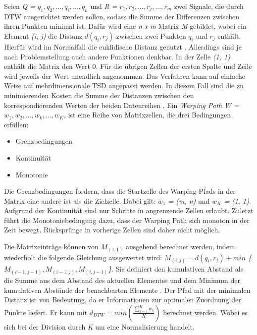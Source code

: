 Seien \emph{Q = $q_{1}, q_{2}, ... , q_{i}, ... , q_{n}$} und \emph{R = $r_{1}, r_{2}, ... , r_{j}, ... , r_{m}$}
zwei Signale, die durch \ac{DTW} ausgerichtet werden sollen, sodass die Summe der Differenzen zwischen ihren Punkten minimal ist.
Dafür wird eine \emph{n x m} Matrix \emph{M} gebildet, wobei ein Element \emph{(i, j)} die Distanz \emph{$d(q_{i}, r_{j})$}
zwischen zwei Punkten \emph{$q_{i}$} und \emph{$r_{j}$} enthält.
Hierfür wird im Normalfall die euklidische Distanz genutzt \citep{warren_liao_clustering_2005}.
Allerdings sind je nach Problemstellung auch andere Funktionen denkbar.
In der Zelle \emph{(1, 1)} enthält die Matrix den Wert 0.
Für die übrigen Zellen der ersten Spalte und Zeile wird jeweils der Wert {\glqq unendlich\grqq} angenommen.
Das Verfahren kann auf einfache Weise auf mehrdimensionale \ac{TSD} angepasst werden.
In diesem Fall sind die zu minimierenden Kosten die Summe
der Distanzen zwischen den korrespondierenden Werten der beiden Datenreihen \citep{mohammadzade_dynamic_2021}.
Ein \emph{Warping Path} \emph{W = $w_{1}, w_{2}, ... , w_{k}, ... , w_{K}$},
ist eine Reihe von Matrixzellen, die drei Bedingungen erfüllen:
\begin{itemize}
    \item Grenzbedingungen
    \item Kontinuität
    \item Monotonie
\end{itemize}
Die Grenzbedingungen fordern, dass die Startzelle des Warping Pfads in der Matrix eine andere ist als die Zielzelle.
Dabei gilt: \emph{$w_{1}$ = (m, n)} und \emph{$w_{K}$ = (1, 1)}.
Aufgrund der Kontinuität sind nur Schritte in angrenzende Zellen erlaubt.
Zuletzt führt die Monotoniebedingung dazu, dass der Warping Path sich monoton in der Zeit bewegt.
Rücksprünge in vorherige Zellen sind daher nicht möglich.

Die Matrixeinträge können von \emph{$M_{(1, 1)}$} ausgehend berechnet werden,
indem wiederholt die folgende Gleichung ausgewertet wird:
\emph{$ M_{(i, j)} = d(q_{i}, r_{j}) + min $ \{$M_{(i - 1, j - 1)}, M_{(i - 1, j)}, M_{(i, j - 1)} $\}}.
Sie definiert den kumulativen Abstand als die Summe aus dem Abstand des aktuellen Elementes
und dem Minimum der kumulativen Abstände der benachbarten Elemente \citep{warren_liao_clustering_2005}.
Der Pfad mit der minimalen Distanz ist von Bedeutung,
da er Informationen zur optimalen Zuordnung der Punkte liefert.
Er kann mit \emph{$d_{DTW} = min(\frac{\sum_{k = 1}^{K}w_{k}}{K})$} berechnet werden.
Wobei es sich bei der Division durch \emph{K} um eine Normalisierung handelt.


